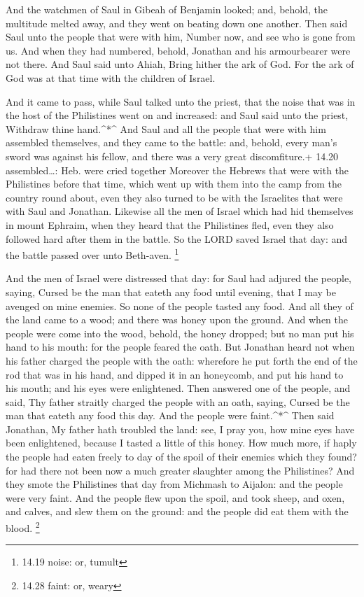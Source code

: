  And the watchmen of Saul in Gibeah of Benjamin looked;
and, behold, the multitude melted away, and they went on beating down
one another.  Then said Saul unto the people that were with
him, Number now, and see who is gone from us. And when they had
numbered, behold, Jonathan and his armourbearer were not there.
 And Saul said unto Ahiah, Bring hither the ark of God. For
the ark of God was at that time with the children of Israel.

 And it came to pass, while Saul talked unto the priest,
that the noise that was in the host of the Philistines went on and
increased: and Saul said unto the priest, Withdraw thine hand.\^{}*\^{}
 And Saul and all the people that were with him assembled
themselves, and they came to the battle: and, behold, every man's sword
was against his fellow, and there was a very great discomfiture.+ 14.20
assembled\ldots: Heb. were cried together  Moreover the
Hebrews that were with the Philistines before that time, which went up
with them into the camp from the country round about, even they also
turned to be with the Israelites that were with Saul and Jonathan.
 Likewise all the men of Israel which had hid themselves in
mount Ephraim, when they heard that the Philistines fled, even they also
followed hard after them in the battle.  So the LORD saved
Israel that day: and the battle passed over unto Beth-aven. \footnote{14.19
  noise: or, tumult}

 And the men of Israel were distressed that day: for Saul
had adjured the people, saying, Cursed be the man that eateth any food
until evening, that I may be avenged on mine enemies. So none of the
people tasted any food.  And all they of the land came to a
wood; and there was honey upon the ground.  And when the
people were come into the wood, behold, the honey dropped; but no man
put his hand to his mouth: for the people feared the oath. 
But Jonathan heard not when his father charged the people with the oath:
wherefore he put forth the end of the rod that was in his hand, and
dipped it in an honeycomb, and put his hand to his mouth; and his eyes
were enlightened.  Then answered one of the people, and
said, Thy father straitly charged the people with an oath, saying,
Cursed be the man that eateth any food this day. And the people were
faint.\^{}*\^{}  Then said Jonathan, My father hath
troubled the land: see, I pray you, how mine eyes have been enlightened,
because I tasted a little of this honey.  How much more, if
haply the people had eaten freely to day of the spoil of their enemies
which they found? for had there not been now a much greater slaughter
among the Philistines?  And they smote the Philistines that
day from Michmash to Aijalon: and the people were very faint.
 And the people flew upon the spoil, and took sheep, and
oxen, and calves, and slew them on the ground: and the people did eat
them with the blood. \footnote{14.28 faint: or, weary}

